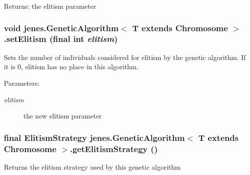 \begin{Desc}
\item[Returns:]the elitism parameter \end{Desc}
\hypertarget{classjenes_1_1_genetic_algorithm_3_01_t_01extends_01_chromosome_01_4_27f67506714b18eb15d890bfa3d5b0ab}{
\subsubsection[setElitism]{\setlength{\rightskip}{0pt plus 5cm}void jenes.GeneticAlgorithm$<$ T extends Chromosome $>$.setElitism (final int {\em elitism})}}
\label{classjenes_1_1_genetic_algorithm_3_01_t_01extends_01_chromosome_01_4_27f67506714b18eb15d890bfa3d5b0ab}


Sets the number of individuals considered for elitism by the genetic algorithm. If it is 0, elitism has no place in this algorithm. 

\begin{Desc}
\item[Parameters:]
\begin{description}
\item[{\em elitism}]the new elitism parameter \end{description}
\end{Desc}
\hypertarget{classjenes_1_1_genetic_algorithm_3_01_t_01extends_01_chromosome_01_4_d227ba9924206ee18f69d24ea4ee4ab0}{
\subsubsection[getElitismStrategy]{\setlength{\rightskip}{0pt plus 5cm}final {\bf ElitismStrategy} jenes.GeneticAlgorithm$<$ T extends Chromosome $>$.getElitismStrategy ()}}
\label{classjenes_1_1_genetic_algorithm_3_01_t_01extends_01_chromosome_01_4_d227ba9924206ee18f69d24ea4ee4ab0}


Returns the elitism strategy used by this genetic algorithm 

